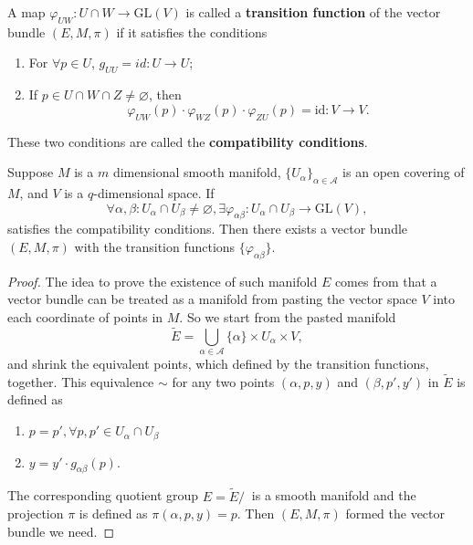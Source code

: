 \begin{definition}
A map $\varphi_{UW}:U\cap W\to \text{GL}(V)$ is called a \textbf{transition function} of the vector bundle $(E,M,\pi)$ if it satisfies the conditions
\begin{enumerate}
\item For $\forall p\in U$, $g_{UU}=id:U\to U$;
\item If $p\in U\cap W\cap Z\ne\varnothing$, then
\begin{equation}
\varphi_{UW}(p)\cdot\varphi_{WZ}(p)\cdot\varphi_{ZU}(p)=\text{id}:V\to V.
\end{equation}
\end{enumerate}
These two conditions are called the \textbf{compatibility conditions}.
\end{definition}

\begin{theorem}
Suppose $M$ is a $m$ dimensional smooth manifold, $\{U_\alpha\}_{\alpha\in\mathcal{A}}$ is an open covering of $M$, and $V$ is a $q$-dimensional space. If 
\begin{equation*}
\forall \alpha,\beta: U_\alpha\cap U_\beta\ne\varnothing, \exists \varphi_{\alpha\beta}:U_\alpha\cap U_\beta\to \text{GL}(V),
\end{equation*}
satisfies the compatibility conditions. Then there exists a vector bundle $(E,M,\pi)$ with the transition functions $\{\varphi_{\alpha\beta}\}$.
\end{theorem}

\begin{proof}
The idea to prove the existence of such manifold $E$ comes from that a vector bundle can be treated as a manifold from pasting the vector space $V$ into each coordinate of points in $M$. So we start from the pasted manifold 
\begin{equation*}
\tilde{E}=\bigcup_{\alpha\in\mathcal{A}}\{\alpha\}\times U_\alpha\times V,
\end{equation*} 
and shrink the equivalent points, which defined by the transition functions, together. This equivalence $\sim$ for any two points $(\alpha,p,y)$ and $(\beta,p',y')$ in $\tilde E$ is defined as
\begin{enumerate}
\item $p=p',\forall p,p'\in U_\alpha\cap U_\beta$
\item $y=y'\cdot g_{\alpha\beta}(p)$.
\end{enumerate}
The corresponding quotient group $E=\tilde E/~$ is a smooth manifold and the projection $\pi$ is defined as $\pi(\alpha,p,y)=p$. Then $(E,M,\pi)$ formed the vector bundle we need.
\end{proof}



